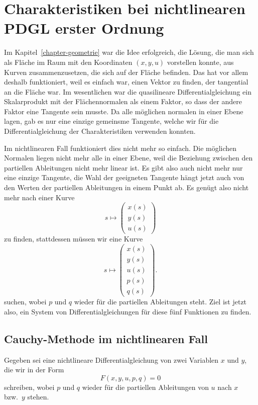 \section{Charakteristiken bei nichtlinearen PDGL erster Ordnung}
Im Kapitel~\ref{chapter-geometrie} war die Idee erfolgreich, die Lösung,
die man sich als Fläche im Raum mit den Koordinaten $(x,y,u)$
vorstellen konnte, aus Kurven zusammenzusetzen, die sich auf der
Fläche befinden. Das hat vor allem deshalb funktioniert, weil es
einfach war, einen Vektor zu finden, der tangential an die Fläche
war. Im wesentlichen war die quasilineare Differentialgleichung ein
Skalarprodukt mit der Flächennormalen als einem Faktor, so dass
der andere Faktor eine Tangente sein musste. Da alle möglichen
normalen in einer Ebene lagen, gab es nur eine einzige gemeinsme
Tangente, welche wir für die Differentialgleichung der
Charakteristiken verwenden konnten.

Im nichtlinearen Fall funktioniert dies nicht mehr so einfach.
Die möglichen Normalen liegen nicht mehr alle in einer Ebene,
weil die Beziehung zwischen den partiellen Ableitungen nicht
mehr linear ist. Es gibt also auch nicht mehr nur eine einzige
Tangente, die Wahl der geeigneten Tangente hängt jetzt auch
von den Werten der partiellen Ableitungen in einem Punkt ab.
Es genügt also nicht mehr nach einer Kurve
\[
s\mapsto
\begin{pmatrix}
x(s)\\
y(s)\\
u(s)
\end{pmatrix}
\]
zu finden, stattdessen müssen wir eine Kurve 
\[
s\mapsto
\begin{pmatrix}
x(s)\\
y(s)\\
u(s)\\
p(s)\\
q(s)
\end{pmatrix}.
\]
suchen, wobei $p$ und $q$ wieder für die partiellen Ableitungen
steht. Ziel ist jetzt also, ein System von Differentialgleichungen
für diese fünf Funktionen zu finden.

\subsection{Cauchy-Methode im nichtlinearen Fall}
Gegeben sei eine nichtlineare Differentialgleichung von zwei
Variablen $x$ und $y$, die wir in der Form
\[
F(x,y,u,p,q)=0
\]
schreiben, wobei $p$ und $q$ wieder für die partiellen Ableitungen
von $u$ nach $x$ bzw.~$y$ stehen.

